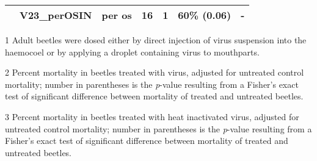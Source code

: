 \documentclass[12pt,letterpaper,english,bibliography=totocnumbered]{scrartcl}
\begin{document}
\begin{table}[h]
\begin{adjustbox}{width=\columnwidth,center}
\begin{threeparttable}
\begin{tabular}{ l l l c c c c }
		                      & V23\_perOSIN\cite{moore_bioassay_2019-1}        & per os          & 16      & 1          & 60\% (0.06)                     & -                               \\ \bottomrule
	\end{tabular}
	\begin{tablenotes}[para]
		\item[1] Adult beetles were dosed either by direct injection of virus suspension into the haemocoel or by applying a droplet containing virus to mouthparts. \\ 
		\item[2] Percent mortality in beetles treated with virus, adjusted for untreated control mortality; 
		number in parentheses is the \textit{p}-value resulting from a Fisher's exact test of significant difference between mortality of treated and untreated beetles. \\
		\item[3] Percent mortality in beetles treated with heat inactivated virus, adjusted for untreated control mortality; 
		number in parentheses is the \textit{p}-value resulting from a Fisher's exact test of significant difference between mortality of treated and untreated beetles. 
	\end{tablenotes}
	 		
\end{threeparttable}
	\end{adjustbox}
\end{table}

\begin{comment}

\clearpage
\begin{table}
	\begin{threeparttable}
		\caption{Sample ANOVA table}
		\begin{tabular}{lllll}
			\toprule
			Stubhead & \( df \) & \( f \) & \( \eta \) & \( p \) \\
			\midrule
			&     \multicolumn{4}{c}{Spanning text}     \\
			Row 1    & 1        & 0.67    & 0.55       & 0.41    \\
			Row 2    & 2        & 0.02    & 0.01       & 0.39    \\
			Row 3    & 3        & 0.15    & 0.33       & 0.34    \\
			Row 4    & 4        & 1.00    & 0.76       & 0.54    \\
			\bottomrule
		\end{tabular}
		\begin{tablenotes}
			\small
			\item This is where authors provide additional information about
			the data, including whatever notes are needed.
		\end{tablenotes}
	\end{threeparttable}
\end{table}

\end{comment}
\end{document}
